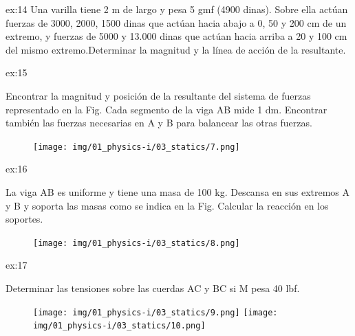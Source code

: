 \begin{multicols}{2}
     \begin{excercise}[][][$R=6600\ \mathrm{dinas}$, $x_c=77.3 \ \mathrm{cm}$]{ex:14}{
        Una varilla tiene 2 m de largo y pesa 5 gmf (4900 dinas). Sobre ella actúan fuerzas de 3000, 2000, 1500 dinas que actúan hacia abajo a 0, 50 y 200 cm de un extremo, y fuerzas de 5000 y 13.000 dinas que actúan hacia arriba a 20 y 100 cm del mismo extremo.Determinar la magnitud y la línea de acción de la resultante.
         }
     \end{excercise}

     \begin{excercise}[][][$R=-30\ \mathrm{Kgf}$, $x_c=56.7 \ \mathrm{cm}$, $R_A=8.8 \ \mathrm{Kgf}$, $R_B=21.2\ \mathrm{Kgf}$]{ex:15}{
         Encontrar la magnitud y posición de la resultante del sistema de fuerzas representado en la Fig. Cada segmento de la viga AB mide 1 dm. Encontrar también las fuerzas necesarias en A y B para balancear las otras fuerzas. 
         \begin{figure}[H]
             \centering
             \texttt{[image: img/01\_physics-i/03\_statics/7.png]}
         \end{figure}
         }
     \end{excercise}

     \begin{excercise}[][][$R_A=1143 \ \mathrm{N}$, $R_B=1797\ \mathrm{N}$]{ex:16}{
         La viga AB es uniforme y tiene una masa de 100 kg. Descansa en sus extremos A y B y soporta las masas como se indica en la Fig. Calcular la reacción en los soportes.         
         \begin{figure}[H]
             \centering
             \texttt{[image: img/01\_physics-i/03\_statics/8.png]}
         \end{figure}
         }
     \end{excercise}
     \begin{excercise}[][][$(a)\ T_1=T_2=26.1 \ \mathrm{lbf}$, $(b) T_1=56.4\ \mathrm{lbf}, T_2=40\ \mathrm{lbf}$, $(c)\ T_1=T_2=40 \ \mathrm{lbf}$, $(d) T_1=40\ \mathrm{lbf}, T_2=69.2\ \mathrm{lbf}$]{ex:17}{
         Determinar las tensiones sobre las cuerdas AC y BC si M pesa 40 lbf.   
         \begin{figure}[H]
             \centering
             \texttt{[image: img/01\_physics-i/03\_statics/9.png]}
             \texttt{[image: img/01\_physics-i/03\_statics/10.png]}
         \end{figure}
         }
     \end{excercise}


\end{multicols}
